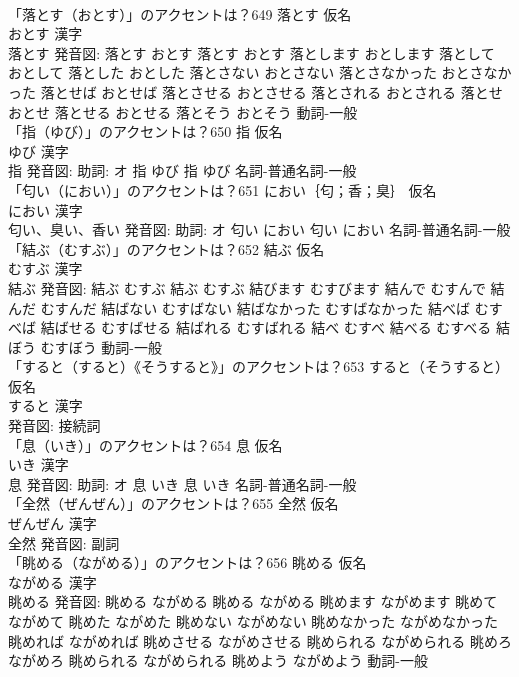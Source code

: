 \documentclass[8pt]{extreport}
\begin{document}
\begin{CJK}{UTF8}{min}
\\	「落とす（おとす）」のアクセントは？649	落とす 仮名　
\\	おとす 漢字　
\\	落とす 発音図:	落とす おとす		落とす おとす 落とします おとします 落として おとして 落とした おとした 落とさない おとさない 落とさなかった おとさなかった 落とせば おとせば 落とさせる おとさせる 落とされる おとされる 落とせ おとせ 落とせる おとせる 落とそう おとそう				動詞-一般 
\\	「指（ゆび）」のアクセントは？650	指 仮名　
\\	ゆび 漢字　
\\	指 発音図: 助詞: オ	指 ゆび		指 ゆび				名詞-普通名詞-一般 
\\	「匂い（におい）」のアクセントは？651	におい｛匂；香；臭｝ 仮名　
\\	におい 漢字　
\\	匂い、臭い、香い 発音図: 助詞: オ	匂い におい		匂い におい				名詞-普通名詞-一般 
\\	「結ぶ（むすぶ）」のアクセントは？652	結ぶ 仮名　
\\	むすぶ 漢字　
\\	結ぶ 発音図:	結ぶ むすぶ		結ぶ むすぶ 結びます むすびます 結んで むすんで 結んだ むすんだ 結ばない むすばない 結ばなかった むすばなかった 結べば むすべば 結ばせる むすばせる 結ばれる むすばれる 結べ むすべ 結べる むすべる 結ぼう むすぼう				動詞-一般 
\\	「すると（すると）《そうすると》」のアクセントは？653	すると（そうすると） 仮名　
\\	すると 漢字　
\\	発音図:							接続詞 
\\	「息（いき）」のアクセントは？654	息 仮名　
\\	いき 漢字　
\\	息 発音図: 助詞: オ	息 いき		息 いき				名詞-普通名詞-一般 
\\	「全然（ぜんぜん）」のアクセントは？655	全然 仮名　
\\	ぜんぜん 漢字　
\\	全然 発音図:							副詞 
\\	「眺める（ながめる）」のアクセントは？656	眺める 仮名　
\\	ながめる 漢字　
\\	眺める 発音図:	眺める ながめる		眺める ながめる 眺めます ながめます 眺めて ながめて 眺めた ながめた 眺めない ながめない 眺めなかった ながめなかった 眺めれば ながめれば 眺めさせる ながめさせる 眺められる ながめられる 眺めろ ながめろ 眺められる ながめられる 眺めよう ながめよう				動詞-一般 

\end{CJK}
\end{document}
